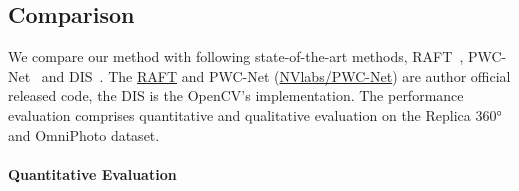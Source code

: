 


\subsection{Comparison}

We compare our method with following state-of-the-art methods, RAFT~\cite{TeedD2020a}, PWC-Net~\cite{SunYLK2018} and DIS~\cite{KroegTDV2016}. 
%
The \href{https://github.com/princeton-vl/RAFT}{RAFT} and PWC-Net (\href{https://github.com/NVlabs/PWC-Net}{NVlabs/PWC-Net}) are author official released code, the DIS is the OpenCV's implementation. 
% 
The performance evaluation comprises quantitative and qualitative evaluation on the Replica 360° and OmniPhoto dataset.


\paragraph{Quantitative Evaluation}

